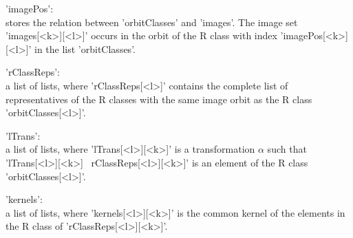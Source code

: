 'imagePos':\\
        stores  the relation  between 'orbitClasses'  and  'images'.  The
        image set 'images[<k>][<l>]'  occurs in the orbit  of the R class
        with index 'imagePos[<k>][<l>]' in the list 'orbitClasses'.
        
'rClassReps':\\
        a list of  lists,  where 'rClassReps[<l>]' contains  the complete
        list  of representatives  of  the R  classes  with the same image
        orbit as the R class 'orbitClasses[<l>]'.
        
'lTrans':\\
        a  list of lists,   where 'lTrans[<l>][<k>]' is  a transformation
        $\alpha$ such that 'lTrans[<l>][<k>] \*\ rClassReps[<l>][<k>]' is
        an element of the R class 'orbitClasses[<l>]'.
        
'kernels':\\
        a  list of lists, where  'kernels[<l>][<k>]' is the common kernel
        of the elements in the R class of 'rClassReps[<l>][<k>]'.


